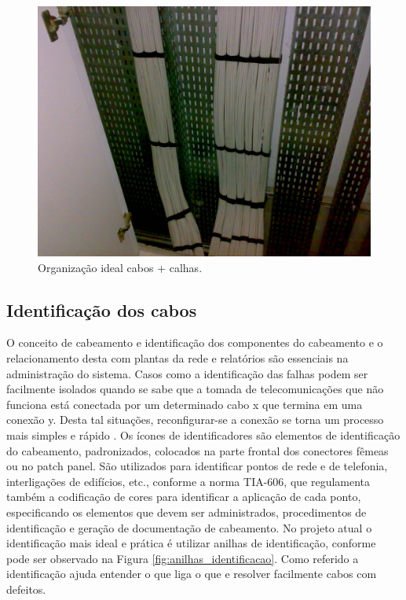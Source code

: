\documentclass[	DIV=calc,%
							paper=a4,%
							fontsize=12pt,%
							onecolumn]{scrartcl}	 					%
\begin{document}
\begin{figure}[!htbp]
	\centering
	\includegraphics[width=\textwidth]{./imagens/organizacao_ideal.png}
	\caption{Organização ideal cabos + calhas.}
	\label{fig:cabeamento_ideal}
\end{figure}


\subsection{Identificação dos cabos}
O conceito de cabeamento e identificação dos componentes do cabeamento e o relacionamento desta com plantas da rede e relatórios são essenciais na administração do sistema. Casos como a identificação das falhas podem ser facilmente isolados quando se sabe que a tomada de telecomunicações que não funciona está conectada por um determinado cabo x que termina em uma conexão y. Desta tal situações, reconfigurar-se a conexão se torna um processo mais simples e rápido \cite{pinheiro2015}. Os ícones de identificadores são elementos de identificação do cabeamento, padronizados, colocados na parte frontal dos conectores fêmeas ou no patch panel. São utilizados para identificar pontos de rede e de telefonia, interligações de edifícios, etc., conforme a norma TIA-606, que regulamenta também a codificação de cores para identificar a aplicação de cada ponto, especificando os elementos que devem ser administrados, procedimentos de identificação e geração de documentação de cabeamento.  
No projeto atual o identificação mais ideal e prática é utilizar anilhas de identificação, conforme pode ser observado na Figura \ref{fig:anilhas_identificacao}. Como referido a identificação ajuda entender o que liga o que e resolver facilmente cabos com defeitos.
\end{document}
